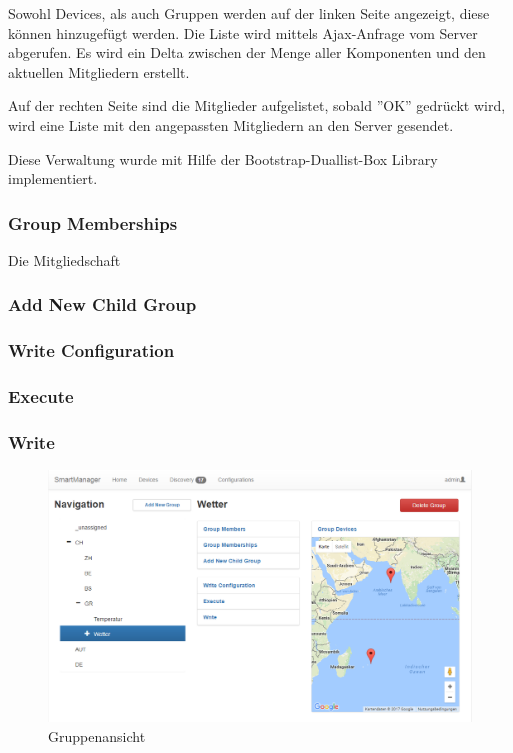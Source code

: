 Sowohl Devices, als auch Gruppen werden auf der linken Seite angezeigt, diese können hinzugefügt werden. Die Liste wird mittels Ajax-Anfrage vom Server abgerufen. Es wird ein Delta zwischen der Menge aller Komponenten und den aktuellen Mitgliedern erstellt.

Auf der rechten Seite sind die Mitglieder aufgelistet, sobald ''OK'' gedrückt wird, wird eine Liste mit den angepassten Mitgliedern an den Server gesendet.

Diese Verwaltung wurde mit Hilfe der Bootstrap-Duallist-Box Library implementiert. 
\subsubsection{Group Memberships}
Die Mitgliedschaft 

\subsubsection{Add New Child Group}

\subsubsection{Write Configuration}

\subsubsection{Execute}

\subsubsection{Write}

\begin{figure}[H]
\centering
\includegraphics[scale=0.57]{../04_Realisierung/images/userinterface/groups.png}
\caption{Gruppenansicht}
\end{figure}



